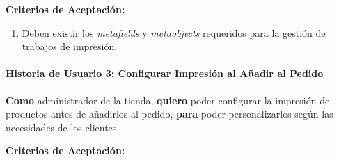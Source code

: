\documentclass[11pt]{article}
\newcommand{\subsubsubsection}[1]{\paragraph{#1}}
\begin{document}
\vspace{0.5cm}
\textbf{Criterios de Aceptación:}
\begin{enumerate}[label=\arabic*.]
    \item Deben existir los \textit{metafields} y \textit{metaobjects} requeridos para la gestión de trabajos de impresión.
\end{enumerate}


\subsubsubsection{Historia de Usuario 3: Configurar Impresión al Añadir al Pedido}\label{sec:historia3}

\textbf{Como} administrador de la tienda, \textbf{quiero} poder configurar la impresión de productos antes de añadirlos al pedido, \textbf{para} poder personalizarlos según las necesidades de los clientes.

\vspace{0.5cm}
\textbf{Criterios de Aceptación:}
\end{document}

